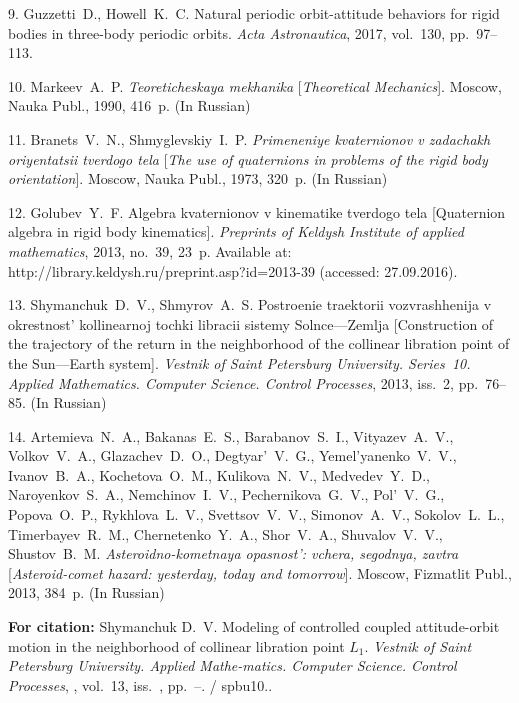 {9. Guzzetti~D., Howell~K.~C. Natural periodic orbit-attitude
behaviors for rigid bodies in three-body periodic orbits.
\textit{Acta Astronautica}, 2017, vol.~130, pp.~97--113.

10. Markeev~A.~P. \textit{Teoreticheskaya mekhanika}
[\textit{Theoretical Mechanics}].  Moscow, Nauka Publ., 1990,
416~p. (In Russian)

11. Branets~V.~N., Shmyglevskiy~I.~P. \textit{Primeneniye
kvaternionov v zadachakh oriyentatsii tverdogo tela} [\textit{The
use of quaternions in problems of the rigid body orientation}].
Moscow, Nauka Publ., 1973, 320~p. (In Russian)

12. Golubev~Y.~F. Algebra kvaternionov v kinematike tverdogo tela
[Quaternion algebra in rigid body kinematics]. \textit{Preprints
of Keldysh Institute of applied mathematics}, 2013, no.~39, 23~p.
Available at: http://library.keldysh.ru/preprint.asp?id=2013-39
(accessed: 27.09.2016).

13. Shymanchuk~D.~V., Shmyrov~A.~S. Postroenie traektorii
vozvrashhenija v okrestnost' kollinearnoj tochki libracii sistemy
Solnce---Zemlja [Construction of the trajectory of the return in
the neighborhood of the collinear libration point of the
Sun---Earth system]. \textit{Vestnik of Saint Petersburg
University. Series~10. Applied Mathematics. Computer Science.
Control Processes}, 2013, iss.~2, pp.~76--85. (In Russian)

14. Artemieva~N.~A., Bakanas~E.~S., Barabanov~S.~I.,
Vityazev~A.~V., Volkov~V.~A., Glazachev~D.~O., Degtyar'~V.~G.,
Yemel'yanenko~V.~V., Ivanov~B.~A., Kochetova~O.~M.,
Kulikova~N.~V., Medvedev~Y.~D., Naroyenkov~S.~A., Nemchinov~I.~V.,
Pechernikova~G.~V., Pol'~V.~G., Popova~O.~P., Rykhlova~L.~V.,
Svettsov~V.~V., Simonov~A.~V., Sokolov~L.~L., Timerbayev~R.~M.,
Chernetenko~Y.~A., Shor~V.~A., Shuvalov~V.~V.,
Shustov~B.~M.\textit{ Asteroidno-kometnaya opasnost': vchera,
segodnya, zavtra} [\textit{Asteroid-comet hazard: yesterday, today
and tomorrow}]. Moscow, Fizmatlit Publ., 2013, 384~p. (In Russian)





\vskip 2mm

{\bf For citation:}  Shymanchuk D.~V. Modeling of controlled
coupled attitude-orbit motion in the neighborhood of collinear
libration point $L_1$. {\it Vestnik of Saint Petersburg
University. Applied Mathe-\linebreak matics. Computer Science.
Control Processes}, \issueyear, vol.~13, iss.~\issuenum,
pp.~\pageref{p3}--\pageref{p3e}. \doivyp/
spbu10.\issueyear.



}
